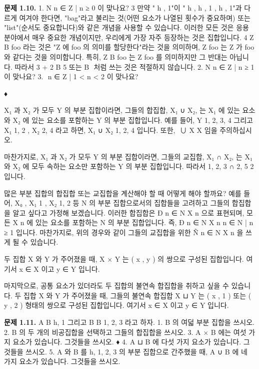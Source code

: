 \documentclass[11pt, a4paper, twoside, openany]{book}
\begin{document}
\par\medskip
\textbf{문제 1.10.}
1. N  { n ∈ Z | n ≥ 0 } 이 맞나요?
3 만약 " h , 1"이 " h , h , 1 , h , 1"과 다르게 여겨야 한다면, "bag"라고 불리는 것(어떤 요소가 나열된 횟수가 중요하며) 또는 "list"(순서도 중요합니다)와 같은 개념을 사용할 수 있습니다. 이러한 모든 것은 응용 분야에서 매우 중요한 개념이지만, 우리에게 가장 자주 등장하는 것은 집합입니다.
4 Z B foo 라는 것은 "Z 에 foo 의 의미를 할당한다"라는 것을 의미하며, Z  foo 는 Z 가 foo 와 같다는 것을 의미합니다. 특히, Z B foo 는 Z  foo 를 의미하지만 그 반대는 아닙니다. 따라서 3 + 2 B 5 또는 {} B  처럼 쓰는 것은 적절하지 않습니다.
2. N  { n ∈ Z | n ≥ 1 } 이 맞나요?
3.   { n ∈ Z | 1 < n < 2 } 이 맞나요?

\par\medskip
♦

\par\medskip
X₁ 과 X₂ 가 모두 Y 의 부분 집합이라면, 그들의 합집합, X₁ ∪ X₂, 는 X₁ 에 있는 요소와 X₂ 에 있는 요소를 포함하는 Y 의 부분 집합입니다. 예를 들어, Y  { 1, 2, 3, 4 } 그리고 X₁  { 1, 2 }, X₂  { 2, 4 } 라고 하면, X₁ ∪ X₂  { 1, 2, 4 } 입니다. 또한,  ∪ X  X 임을 주의하십시오.

\par\medskip
마찬가지로, X₁ 과 X₂ 가 모두 Y 의 부분 집합이라면, 그들의 교집합, X₁ ∩ X₂, 는 X₁ 와 X₂ 에 모두 속하는 요소만 포함하는 Y 의 부분 집합입니다. 따라서 { 1, 2, 3 } ∩{ 2, 5 }  { 2 } 입니다.

\par\medskip
많은 부분 집합의 합집합 또는 교집합을 계산해야 할 때 어떻게 해야 할까요? 예를 들어, X₀  , X₁  { 1 }, X₂  { 1, 2 } 등 N 의 부분 집합으로서의 집합들을 고려하고 그들의 합집합을 알고 싶다고 가정해 보겠습니다. 이러한 합집합은 Ð
n ∈ N X n 으로 표현되며, 모든 X n 에 있는 요소를 포함하는 N 의 부분 집합입니다. 즉, Ð
n ∈ N X n  { n ∈ N | n ≥ 1 } 입니다. 마찬가지로, 위의 경우와 같이 그들의 교집합을 위한 Ñ
n ∈ N X n 을 쓰게 될 수 있습니다.

\par\medskip
두 집합 X 와 Y 가 주어졌을 때, X × Y 는 ( x , y ) 의 쌍으로 구성된 집합입니다. 여기서 x ∈ X 이고 y ∈ Y 입니다.

\par\medskip
마지막으로, 공통 요소가 있더라도 두 집합의 불연속 합집합을 취하고 싶을 수 있습니다. 두 집합 X 와 Y 가 주어졌을 때, 그들의 불연속 합집합 X ⊔ Y 는 ( x , 1 ) 또는 ( y , 2 ) 형태의 쌍으로 구성된 집합입니다. 여기서 x ∈ X 이고 y ∈ Y 입니다.

\par\medskip
\textbf{문제 1.11.}
A B { h, 1 } 그리고 B B { 1, 2, 3 } 라고 하자.
1. B 의 여덟 부분 집합을 쓰시오.
2. B 의 두 개의 비공집합을 선택하고 그들의 합집합을 쓰시오.
3. A × B 에는 여섯 가지 요소가 있습니다. 그것들을 쓰시오.
♦
4. A ⊔ B 에 다섯 가지 요소가 있습니다. 그것들을 쓰시오.
5. A 와 B 를 { h, 1, 2, 3 } 의 부분 집합으로 간주했을 때, A ∪ B 에 네 가지 요소가 있습니다. 그것들을 쓰시오.
\end{document}
